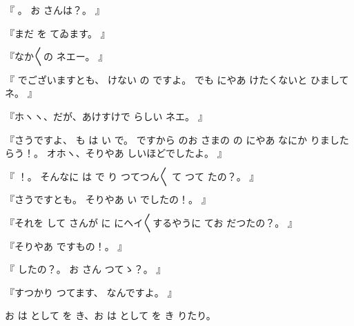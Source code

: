 『
。
お
さんは？。
』

『まだ
を
てゐます。
』

『なか〳〵の
ネエー。
』

『
でございますとも、
けない
の
ですよ。
でも
にやあ
けたくないと
ひましてネ。
』

『ホヽヽ、だが、あけすけで
らしい
ネエ。
』

『さうですよ、
も
は
い
で。
ですから
のお
さまの
の
にやあ
なにか
りましたらう！。
オホヽ、そりやあ
しいほどでしたよ。
』

『
！。
そんなに
は
で
り
つてつん〳〵
て
つて
たの？。
』

『さうですとも。
そりやあ
い
でしたの！。
』

『それを
して
さんが
に
にヘイ〳〵するやうに
てお
だつたの？。
』

『そりやあ
ですもの！。
』

『
したの？。
お
さん
つてゝ？。
』

『すつかり
つてます、
なんですよ。
』

お
は
として
を
き、お
は
として
を
き
りたり。

